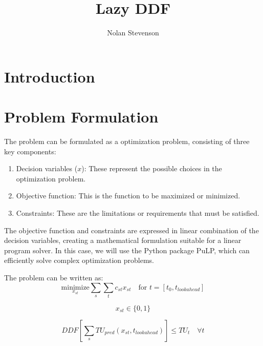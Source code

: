 \documentclass{article}
\title{Lazy DDF}
\author{Nolan Stevenson}
\date{} %
\begin{document}
\maketitle

\newpage
\section{Introduction}


\section{Problem Formulation}

    The problem can be formulated as a optimization problem, consisting of three key components:

    \begin{enumerate}
        \item Decision variables ($x$): These represent the possible choices in the optimization problem.
        \item Objective function: This is the function to be maximized or minimized.
        \item Constraints: These are the limitations or requirements that must be satisfied.
    \end{enumerate}

    The objective function and constraints are expressed in linear combination of the decision variables, creating a mathematical formulation suitable for a linear program solver. In this case, we will use the Python package PuLP, which can efficiently solve complex optimization problems.

    The problem can be written as: \\

    \begin{equation}
        \underset{x_{st}}{\text{minimize}} \sum_{s} \sum_{t} c_{st} x_{st} \quad \text{for } t = [t_0, t_{lookahead}]
        \label{eq:objective}
    \end{equation}


    \begin{equation}
        x_{st} \in \{0, 1\}
        \label{eq:binary}
    \end{equation}

    \begin{equation}
        DDF[ \sum_{s} TU_{pred}(x_{st}, t_{lookahead}) ] \leq TU_t \quad \forall t
        \label{eq:constraint1}
    \end{equation}
\end{document}

